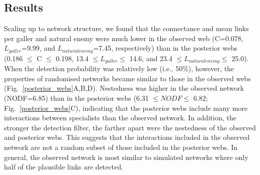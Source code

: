 \documentclass[12pt]{article}
\begin{document}
  \subsection*{Results}

      Scaling up to network structure, we found that the connectance and mean links per galler and natural enemy were much lower in the observed web (C=0.078, $L_{galler}$=9.99, and $L_{natural enemy}$=7.45, respectively) than in the posterior webs (0.186 $\leq$ C $\leq$ 0.198, 13.4 $\leq L_{galler} \leq$ 14.6, and 23.4 $\leq L_{natural enemy} \leq$ 25.0). When the detection probability was relatively low (i.e., 50\%), however, the properties of randomised networks became similar to those in the observed webs (Fig.~\ref{posterior_webs}A,B,D). Nestedness was higher in the observed network (NODF=6.85) than in the posterior webs (6.31 $\leq NODF \leq$ 6.82; Fig.~\ref{posterior_webs}C), indicating that the posterior webs include many more interactions between specialists than the observed network. In addition, the stronger the detection filter, the farther apart were the nestedness of the observed and posterior webs. This suggests that the interactions included in the observed network are not a random subset of those included in the posterior webs. In general, the observed network is most similar to simulated networks where only half of the plausible links are detected. 
\end{document}
